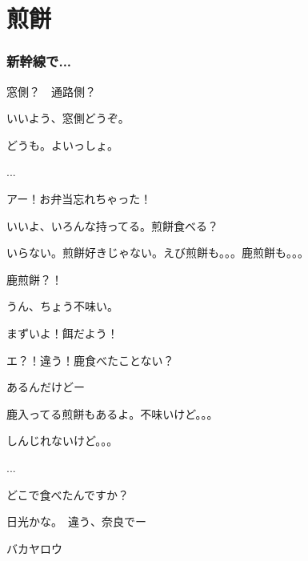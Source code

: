 \chapter*{煎餅}

\subsection*{新幹線で...}

\akun 窓側？　通路側？

\bkun いいよう、窓側どうぞ。

\akun どうも。よいっしょ。

...

\akun アー！お弁当忘れちゃった！

\bkun いいよ、いろんな持ってる。煎餅食べる？

\akun いらない。煎餅好きじゃない。えび煎餅も。。。鹿煎餅も。。。

\bkun 鹿煎餅？！

\akun うん、ちょう不味い。

\bkun まずいよ！餌だよう！

\akun エ？！違う！鹿食べたことない？

\bkun あるんだけどー

\akun 鹿入ってる煎餅もあるよ。不味いけど。。。　

\bkun しんじれないけど。。。

...

\bkun どこで食べたんですか？

\akun 日光かな。　違う、奈良でー

\bkun バカヤロウ


